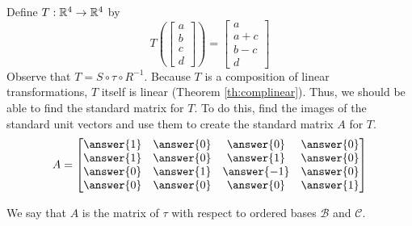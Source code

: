 \documentclass{ximera}
\begin{document}
\begin{exploration}
\begin{center}
\begin{tikzpicture}
      
  \end{tikzpicture}
\end{center}

Define $T:\mathbb{R}^4\rightarrow \mathbb{R}^4$ by $$T\left(\begin{bmatrix}a\\b\\c\\d\end{bmatrix}\right)=\begin{bmatrix}a\\a+c\\b-c\\d\end{bmatrix}$$
Observe that $T=S\circ\tau\circ R^{-1}$.  Because $T$ is a composition of linear transformations, $T$ itself is linear (Theorem \ref{th:complinear}).  Thus, we should be able to find the standard matrix for $T$.  To do this, find the images of the standard unit vectors and use them to  create the standard matrix $A$ for $T$.
$$A=\begin{bmatrix}\answer{1}&\answer{0}&\answer{0}&\answer{0}\\\answer{1}&\answer{0}&\answer{1}&\answer{0}\\\answer{0}&\answer{1}&\answer{-1}&\answer{0}\\\answer{0}&\answer{0}&\answer{0}&\answer{1}\end{bmatrix}$$

We say that $A$ is the matrix of $\tau$ with respect to ordered bases $\mathcal{B}$ and $\mathcal{C}$.


\end{exploration}
\end{document}
